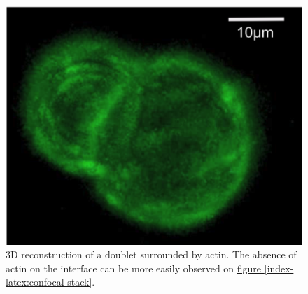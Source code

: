 \documentclass[A4paperpaper,11pt,english]{sphinxmanual}
\begin{document}
\begin{figure}[htbp]
\centering
\capstart

\includegraphics[width=0.500\linewidth]{Fig_03-A.png}
\caption{3D reconstruction of a doublet surrounded by actin. The absence of actin on
the interface can be more easily observed on \hyperref[index-latex:confocal-stack]{figure  \ref*{index-latex:confocal-stack}}.}\label{index-latex:fig3a}\end{figure}
\end{document}
